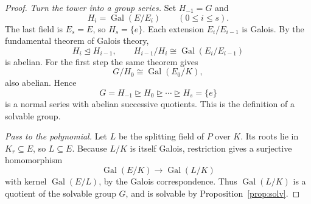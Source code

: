 \begin{proof}
\emph{Turn the tower into a group series.}
Set $H_{-1}=G$ and
\[
H_i=\operatorname{Gal}(E/E_i)
\qquad(0\le i\le s).
\]
The last field is $E_s=E$, so
$H_s=\{e\}$.
Each extension $E_i/E_{i-1}$
is Galois. By the fundamental
theorem of Galois theory,
\[
H_i\trianglelefteq H_{i-1},
\qquad
H_{i-1}/H_i
\cong\operatorname{Gal}(E_i/E_{i-1})
\]
is abelian. For the first
step the same theorem gives
\[
G/H_0\cong\operatorname{Gal}(E_0/K),
\]
also abelian. Hence
\[
G=H_{-1}\trianglerighteq H_0
\trianglerighteq\cdots
\trianglerighteq H_s=\{e\}
\]
is a normal series with abelian
successive quotients. This is the
definition of a solvable group.

\emph{Pass to the polynomial.}
Let $L$ be the splitting field of
$P$ over $K$. Its roots lie in
$K_r\subseteq E$, so $L\subseteq E$.
Because $L/K$ is itself Galois,
restriction gives a surjective
homomorphism
\[
\operatorname{Gal}(E/K)\to
\operatorname{Gal}(L/K)
\]
with kernel $\operatorname{Gal}(E/L)$,
by the Galois correspondence.
Thus $\operatorname{Gal}(L/K)$ is
a quotient of the solvable group
$G$, and is solvable by
Proposition~\ref{prop:solv}.
\end{proof}

